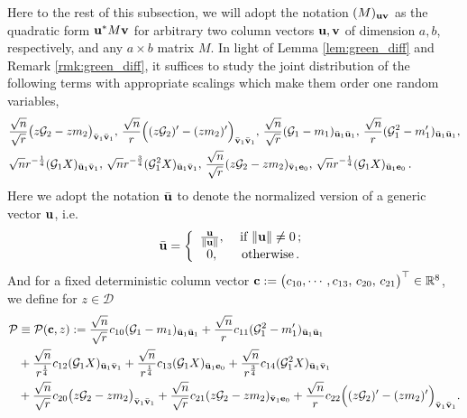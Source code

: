 \documentclass[12pt]{article}
\numberwithin{equation}{section}
\theoremstyle{remark}
\newcommand{\1}{{\rm 1}\kern-0.24em{\rm I}}
\begin{document}
\begin{appendices}
Here to the rest of this subsection, we will adopt the notation $(M)_{{\bf u} {\bf v}}$ as the quadratic form ${\bf u}^* M {\bf v}$ for arbitrary two column vectors ${\bf u}, {\bf v}$ of dimension $a, b$, respectively, and any $a\times b$ matrix $M$.
In light of Lemma \ref{lem:green_diff} and Remark \ref{rmk:green_diff}, it suffices to study the joint distribution of the following terms with appropriate scalings which make them order one random variables,
 \begin{align}\label{randomterms}
& \frac{\sqrt{n}}{\sqrt r}\big( z\mathcal{G}_2-zm_2\big)_{\bar{\bf v}_1\bar{\bf v}_1}, \, \frac{\sqrt{n}}{r}\Big((z\mathcal{G}_2)'-(zm_2)'\Big)_{\bar{\bf v}_1\bar{\bf v}_1}, \,
\frac{\sqrt n}{\sqrt r} (\mathcal{G}_1-m_1)_{\bar{\bf u}_1\bar{\bf u}_1} ,\,  \frac{\sqrt n}{r}(\mathcal{G}_1^2- m_1')_{\bar{\bf u}_1\bar{\bf u}_1}, \notag\\
&
\sqrt n r^{-\frac 14}( \mathcal{G}_1 {X})_{\bar{\bf u}_1\bar{\bf v}_1}, \, \sqrt n r^{-\frac 34}( \mathcal{G}_1^2 {X})_{\bar{\bf u}_1\bar{\bf v}_1},\,  \frac{\sqrt{n}}{\sqrt r}(z\mathcal{G}_2-zm_2)_{\bar{\bf v}_1{\bf e}_0},\, \sqrt n r^{-\frac 14}(\mathcal{G}_1 {X})_{\bar{\bf u}_1{\bf e}_0}\,.
 \end{align} 
 Here we adopt the notation $\bar{\bf u}$ to denote the normalized version of a generic vector ${\bf u}$, i.e. 
 \begin{align*}
 \bar{\bf u} = \left\{
 \begin{array}{cc}
\frac{{\bf u}}{\Vert {\bf u}\Vert}, & \text{ if $\Vert {\bf u}\Vert \neq 0$\,;}\\
0, & \text{ otherwise\,.}
 \end{array}
 \right.
 \end{align*}
 And for a fixed deterministic column vector ${\bf c}:=\big(c_{10}, \cdots, c_{13}, \,c_{20},\, c_{21}\big)^{\top}\in \mathbb{R}^{8}$, we define for $z\in \mathcal{D}$
 \begin{align}\label{def:mP_ori}
 \mathcal{P} &\equiv \mathcal{P}(\mathbf{c},z):= \frac{\sqrt{n}}{\sqrt{r}}  c_{10} (\mathcal{G}_1-m_1)_{\bar{\bf u}_1\bar{\bf u}_1} +  \frac{\sqrt {n}}{r}  c_{11}(\mathcal{G}_1^2- m_1')_{\bar{\bf u}_1\bar{\bf u}_1}  \notag\\
 &
  + \frac{\sqrt n}{r^{\frac14}}  c_{12}( \mathcal{G}_1 {X})_{\bar{\bf u}_1\bar{\bf v}_1} + \frac{\sqrt n}{r^{\frac14}}  c_{13}(\mathcal{G}_1 {X})_{\bar{\bf u}_1{\bf e}_0} +\frac{\sqrt n}{r^{\frac34}} c_{14}( \mathcal{G}_1^2 {X})_{\bar{\bf u}_1\bar{\bf v}_1} \notag\\
 &+  \frac{\sqrt{n}}{\sqrt r} c_{20}\big( z\mathcal{G}_2-zm_2\big)_{\bar{\bf v}_1\bar{\bf v}_1} + \frac{\sqrt{n}}{\sqrt r}c_{21}(z\mathcal{G}_2-zm_2)_{\bar{\bf v}_1{\bf e}_0} + \frac{\sqrt{n}}{ r} c_{22}\Big((z\mathcal{G}_2)'-(zm_2)'\Big)_{\bar{\bf v}_1\bar{\bf v}_1}.

\end{align}
\end{appendices}
\end{document}
